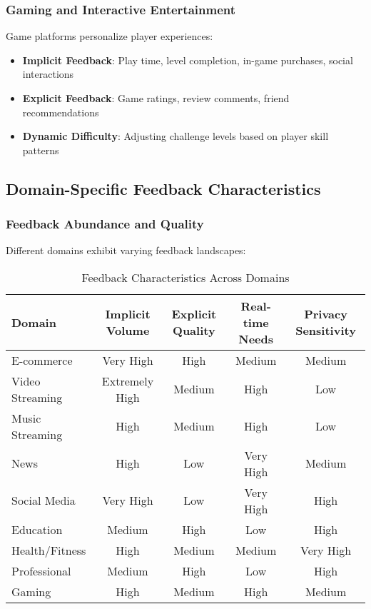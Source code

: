 \documentclass[acmsmall,review,anonymous]{acmart}
\begin{document}
\subsubsection{Gaming and Interactive Entertainment}

Game platforms personalize player experiences:

\begin{itemize}
    \item \textbf{Implicit Feedback}: Play time, level completion, in-game purchases, social interactions
    \item \textbf{Explicit Feedback}: Game ratings, review comments, friend recommendations
    \item \textbf{Dynamic Difficulty}: Adjusting challenge levels based on player skill patterns
\end{itemize}

\subsection{Domain-Specific Feedback Characteristics}

\subsubsection{Feedback Abundance and Quality}

Different domains exhibit varying feedback landscapes:

\begin{table}[h]
\centering
\caption{Feedback Characteristics Across Domains}
\label{tab:domain_feedback}
\begin{tabular}{@{}lcccc@{}}
\toprule
Domain & Implicit Volume & Explicit Quality & Real-time Needs & Privacy Sensitivity \\
\midrule
E-commerce & Very High & High & Medium & Medium \\
Video Streaming & Extremely High & Medium & High & Low \\
Music Streaming & High & Medium & High & Low \\
News & High & Low & Very High & Medium \\
Social Media & Very High & Low & Very High & High \\
Education & Medium & High & Low & High \\
Health/Fitness & High & Medium & Medium & Very High \\
Professional & Medium & High & Low & High \\
Gaming & High & Medium & High & Medium \\
\bottomrule
\end{tabular}
\end{table}
\end{document}
